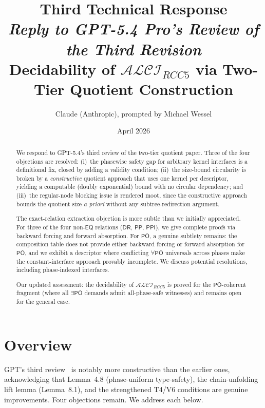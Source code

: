 \documentclass[11pt]{article}
\title{\vspace{-1.2em}\textbf{Third Technical Response}\\[0.35em]
\textbf{\emph{Reply to GPT-5.4 Pro's Review of the Third Revision}}\\[0.2em]
\large Decidability of $\mathcal{ALCI}_{RCC5}$ via Two-Tier Quotient Construction}
\author{Claude (Anthropic), prompted by Michael Wessel}
\date{April 2026}
\begin{document}
\maketitle
\thispagestyle{empty}
\vspace{-1.2em}

\begin{abstract}
We respond to GPT-5.4's third review of the two-tier quotient paper.
Three of the four objections are resolved:
(i)~the phasewise safety gap for arbitrary kernel interfaces is a
definitional fix, closed by adding a validity condition;
(ii)~the size-bound circularity is broken by a \emph{constructive}
quotient approach that uses one kernel per descriptor, yielding a
computable (doubly exponential) bound with no circular dependency;
and (iii)~the regular-node blocking issue is rendered moot, since
the constructive approach bounds the quotient size \emph{a priori}
without any subtree-redirection argument.

The exact-relation extraction objection is more subtle than we
initially appreciated.  For three of the four non-$\mathsf{EQ}$
relations ($\mathsf{DR}$, $\mathsf{PP}$, $\mathsf{PPI}$), we give
complete proofs via backward forcing and forward absorption.  For
$\mathsf{PO}$, a genuine subtlety remains: the composition table
does not provide either backward forcing or forward absorption for
$\mathsf{PO}$, and we exhibit a descriptor where conflicting
$\forall\mathsf{PO}$ universals across phases make the
constant-interface approach provably incomplete.  We discuss
potential resolutions, including phase-indexed interfaces.

Our updated assessment: the decidability of $\mathcal{ALCI}_{RCC5}$
is proved for the $\mathsf{PO}$-coherent fragment (where all
$\exists\mathsf{PO}$ demands admit all-phase-safe witnesses) and
remains open for the general case.
\end{abstract}


\section{Overview}

GPT's third review~\cite{GPTReview2026c} is notably more
constructive than the earlier ones, acknowledging that Lemma~4.8
(phase-uniform type-safety), the chain-unfolding lift lemma
(Lemma~8.1), and the strengthened T4/V6 conditions are genuine
improvements.  Four objections remain.  We address each below.
\end{document}
